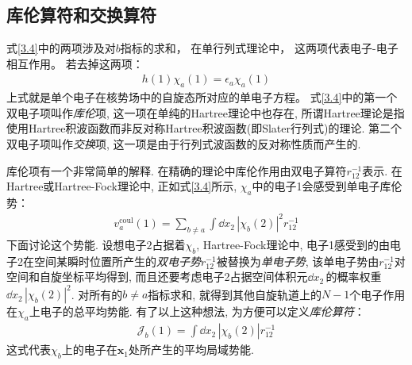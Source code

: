 \subsection{库伦算符和交换算符}
式\eqref{3.4}中的两项涉及对$b$指标的求和，
在单行列式理论中，
这两项代表电子-电子相互作用。
若去掉这两项：
\begin{align}
	h(1)\chi_a(1) = \epsilon_a\chi_a(1)
\end{align}
上式就是单个电子在核势场中的自旋态所对应的单电子\sch 方程。 
式\eqref{3.4}中的第一个双电子项叫作\emph{库伦}项, 
这一项在单纯的Hartree理论中也存在, 
所谓Hartree理论是指使用Hartree积波函数而非反对称Hartree积波函数(即Slater行列式)的理论. 
第二个双电子项叫作\emph{交换}项, 
这一项是由于行列式波函数的反对称性质而产生的.


库伦项有一个非常简单的解释. 
在精确的理论中库伦作用由双电子算符$r_{12}^{-1}$表示. 
在Hartree或Hartree-Fock理论中, 
正如式\eqref{3.4}所示, 
$\chi_a$中的电子1会感受到单电子库伦势：
\begin{align}
	v_a^\mathrm{coul}(1) = \sum_{b\neq a} \int\dd{x}_2\,|\chi_b(2)|^2 r_{12}^{-1}
\end{align}
下面讨论这个势能. 
设想电子$2$占据着$\chi_b$, 
Hartree-Fock理论中, 
电子1感受到的由电子2在空间某瞬时位置所产生的\emph{双电子势$r_{12}^{-1}$}被替换为\emph{单电子势}, 
该单电子势由$r_{12}^{-1}$对空间和自旋坐标平均得到, 
而且还要考虑电子2占据空间体积元$\dd{x}_2\,$的概率权重$\dd{x}_2\,|\chi_b(2)|^2$. 
对所有的$b\neq a$指标求和, 
就得到其他自旋轨道上的$N-1$个电子作用在$\chi_a$上电子的总平均势能. 
有了以上这种想法, 
为方便可以定义\emph{库伦算符}：
\begin{align}
	\mathscr{J}_b(1) = \int\dd{x}_2\,|\chi_b(2)|r_{12}^{-1}
\end{align}
这式代表$\chi_b$上的电子在$\mathbf{x}_1$处所产生的平均局域势能.


